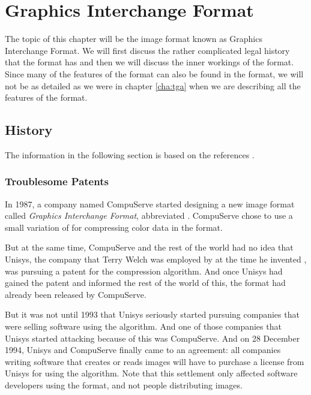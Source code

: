 \begin{comment}
  
\end{comment}

\chapter{Graphics Interchange Format}
\label{cha:gif}

The topic of this chapter will be the image format known as Graphics
Interchange Format. We will first discuss the rather complicated legal
history that the format has and then we will discuss the inner
workings of the format. Since many of the features of the \tga format
can also be found in the \gif format, we will not be as detailed as we
were in chapter \ref{cha:tga} when we are describing all the features
of the \gif format.

\section{History}
\label{sec:gif-history}

The information in the following section is based on the references
\cite{welch85:_u,roelofs09:_histor_portab_networ_graph_png_format,battilana:_gif_contr,caie:_sad,roelofs99:_png}.


\subsection{Troublesome Patents}

\newcommand{\compus}{CompuServe\xspace}

In 1987, a company named \compus started designing a new image format
called \textit{Graphics Interchange Format}, abbreviated \gif. \compus
chose to use a small variation of \lzw for compressing color data in
the \gif format.

But at the same time, \compus and the rest of the world had no idea
that Unisys, the company that Terry Welch was employed by at the time
he invented \lzw, was pursuing a patent for the \lzw compression
algorithm. And once Unisys had gained the patent and informed the rest
of the world of this, the \gif format had already been released by
\compus.

But it was not until 1993 that Unisys seriously started pursuing
companies that were selling software using the \lzw algorithm. And one
of those companies that Unisys started attacking because of this was
\compus. And on 28 December 1994, Unisys and \compus finally came to
an agreement: all companies writing software that creates or reads \gif
images will have to purchase a license from Unisys for using the \lzw
algorithm. Note that this settlement only affected software developers using the
\gif format, and not people distributing \gif images.

